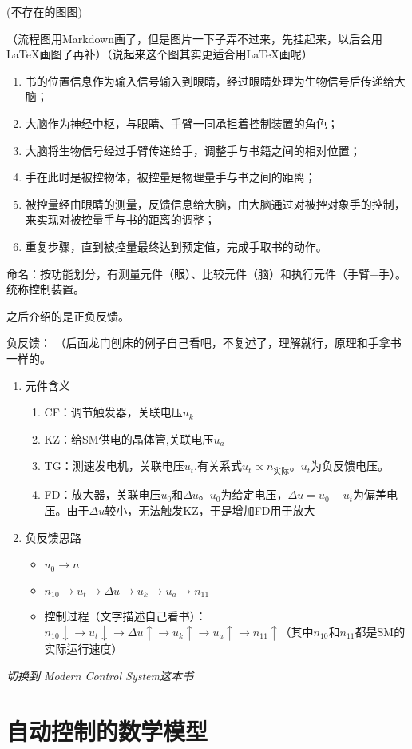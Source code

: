 \documentclass[oneside,a4paper]{ctexbook}
\begin{document}
    (不存在的图图)%
    
    （流程图用Markdown画了，但是图片一下子弄不过来，先挂起来，以后会用LaTeX画图了再补）（说起来这个图其实更适合用\LaTeX 画呢）

\begin{enumerate}    
    \item 书的位置信息作为输入信号输入到眼睛，经过眼睛处理为生物信号后传递给大脑；
    \item 大脑作为神经中枢，与眼睛、手臂一同承担着控制装置的角色；
    \item 大脑将生物信号经过手臂传递给手，调整手与书籍之间的相对位置；
    \item 手在此时是被控物体，被控量是物理量手与书之间的距离；
    \item 被控量经由眼睛的测量，反馈信息给大脑，由大脑通过对被控对象手的控制，来实现对被控量手与书的距离的调整；
    \item 重复步骤，直到被控量最终达到预定值，完成手取书的动作。
\end{enumerate}

命名：按功能划分，有测量元件（眼）、比较元件（脑）和执行元件（手臂+手）。统称控制装置。

之后介绍的是正负反馈。

负反馈：
（后面龙门刨床的例子自己看吧，不复述了，理解就行，原理和手拿书一样的。
\begin{enumerate}
    \item 元件含义
    \begin{enumerate}
        \item CF：调节触发器，关联电压$u_k$
        \item KZ：给SM供电的晶体管,关联电压$u_a$
        \item TG：测速发电机，关联电压$u_t$,有关系式$u_t\propto n_{实际}$。$u_t$为负反馈电压。
        \item FD：放大器，关联电压$u_0$和$\Delta u$。$u_0$为给定电压，$\Delta u = u_0 - u_t$为偏差电压。由于$\Delta u$较小，无法触发KZ，于是增加FD用于放大
    \end{enumerate}
    \item 负反馈思路
    \begin{itemize}
        \item $u_0 \to n$
        \item $n_{10} \to u_t \to \Delta u \to u_k \to u_a \to n_{11}$
        \item 控制过程（文字描述自己看书）：$n_{10}\downarrow \to u_t\downarrow \to \Delta u\uparrow \to u_k\uparrow \to u_a\uparrow \to n_{11}\uparrow$（其中$n_{10}$和$n_{11}$都是SM的实际运行速度）
    \end{itemize}
\end{enumerate}




\emph{切换到 Modern Control System这本书}
\chapter{自动控制的数学模型}






\end{document}
